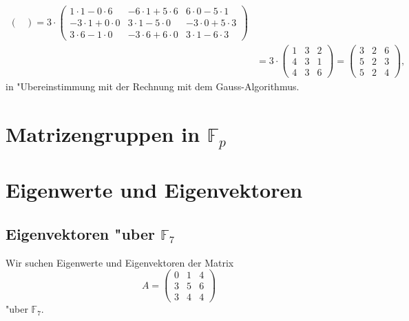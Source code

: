 \begin{align*}
{\begin{pmatrix}
\end{pmatrix}
}
=
3\cdot
\begin{pmatrix}
 1\cdot 1-0\cdot 6&-6\cdot 1+5\cdot 6& 6\cdot 0-5\cdot 1\\
-3\cdot 1+0\cdot 0& 3\cdot 1-5\cdot 0&-3\cdot 0+5\cdot 3\\
 3\cdot 6-1\cdot 0&-3\cdot 6+6\cdot 0& 3\cdot 1-6\cdot 3
\end{pmatrix}
\\
&=
3\cdot
\begin{pmatrix}
1&3&2\\
4&3&1\\
4&3&6
\end{pmatrix}
=
\begin{pmatrix}
3&2&6\\
5&2&3\\
5&2&4
\end{pmatrix},
\end{align*}
in "Ubereinstimmung mit der Rechnung mit dem Gauss-Algorithmus.

\section{Matrizengruppen in $\mathbb F_p$}

\section{Eigenwerte und Eigenvektoren}

\subsection{Eigenvektoren "uber $\mathbb F_7$}
Wir suchen Eigenwerte und Eigenvektoren der Matrix
\[
A
=
\begin{pmatrix}
0&1&4\\
3&5&6\\
3&4&4
\end{pmatrix}
\]
"uber $\mathbb F_7$.

